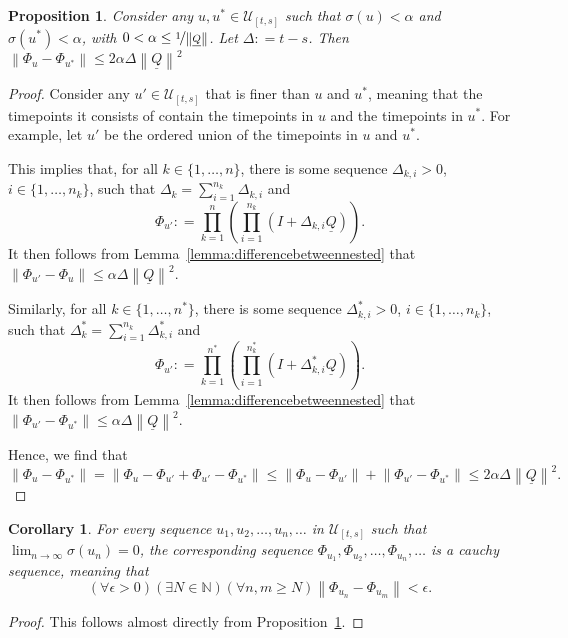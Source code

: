 \documentclass[a4paper,reqno]{amsart}
\newtheorem{proposition}[theorem]{Proposition}
\newtheorem{corollary}[theorem]{Corollary}
\newcommand{\nats}{\mathbb{N}}
\newcommand{\lrate}{\underline{Q}}
\newcommand{\norm}[1]{\left\lVert #1 \right\rVert}
\newcommand{\coloneqq}{:\!=}
\begin{document}
\begin{proposition}\label{prop:differencebetweenu}
Consider any $u,u^*\in\mathcal{U}_{[t,s]}$ such that $\sigma(u)<\alpha$ and $\sigma(u^*)<\alpha$, with $0<\alpha\leq\nicefrac{1}{\norm{\lrate}}$. Let $\Delta\coloneqq t-s$. Then $\norm{\Phi_u-\Phi_{u^*}}\leq 2\alpha\Delta\norm{\lrate}^2$
\end{proposition}
\begin{proof}
Consider any $u'\in\mathcal{U}_{[t,s]}$ that is finer than $u$ and $u^*$, meaning that the timepoints it consists of contain the timepoints in $u$ and the timepoints in $u^*$. For example, let $u'$ be the ordered union of the timepoints in $u$ and $u^*$.

This implies that, for all $k\in\{1,\dots,n\}$, there is some sequence $\Delta_{k,i}>0$, $i\in\{1,\dots,n_k\}$, such that $\Delta_k=\sum_{i=1}^{n_k}\Delta_{k,i}$ and
\begin{equation*}
\Phi_{u'}\coloneqq\prod_{k=1}^n\left(\prod_{i=1}^{n_k}(I+\Delta_{k,i}\lrate)\right).
\end{equation*}
It then follows from Lemma~\ref{lemma:differencebetweennested} that $\norm{\Phi_{u'}-\Phi_u}\leq\alpha\Delta\norm{\lrate}^2$. 

Similarly, for all $k\in\{1,\dots,n^*\}$, there is some sequence $\Delta^*_{k,i}>0$, $i\in\{1,\dots,n_k\}$, such that $\Delta^*_k=\sum_{i=1}^{n_k}\Delta^*_{k,i}$ and
\begin{equation*}
\Phi_{u'}\coloneqq\prod_{k=1}^{n^*}\left(\prod_{i=1}^{n^*_k}(I+\Delta^*_{k,i}\lrate)\right).
\end{equation*}
It then follows from Lemma~\ref{lemma:differencebetweennested} that $\norm{\Phi_{u'}-\Phi_{u^*}}\leq\alpha\Delta\norm{\lrate}^2$.

Hence, we find that
\begin{equation*}
\norm{\Phi_{u}-\Phi_{u^*}}
=
\norm{\Phi_{u}-\Phi_{u'}+\Phi_{u'}-\Phi_{u^*}}
\leq
\norm{\Phi_{u}-\Phi_{u'}}
+
\norm{\Phi_{u'}-\Phi_{u^*}}
\leq2\alpha\Delta\norm{\lrate}^2.
\end{equation*}
\end{proof}

\begin{corollary}\label{corol:cauchy}
For every sequence $u_1,u_2,\dots,u_n,\dots$ in $\mathcal{U}_{[t,s]}$ such that $\lim_{n\to\infty}\sigma(u_n)=0$, the corresponding sequence $\Phi_{u_1},\Phi_{u_2},\dots,\Phi_{u_n},\dots$ is a \emph{cauchy sequence}, meaning that
\begin{equation*}
(\forall \epsilon>0)(\exists N\in\nats)(\forall n,m\geq N)
\norm{\Phi_{u_n}-\Phi_{u_m}}<\epsilon.
\end{equation*}
\end{corollary}
\begin{proof}
This follows almost directly from Proposition~\ref{prop:differencebetweenu}.
\end{proof}
\end{document}
